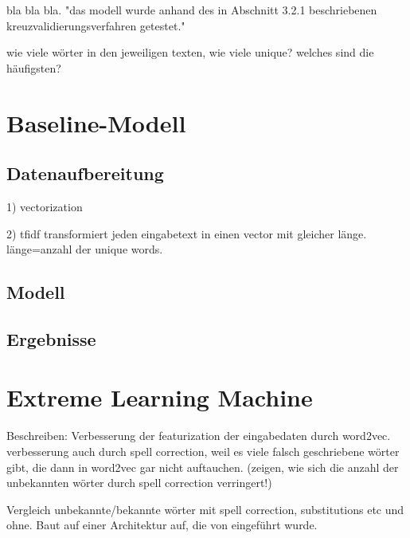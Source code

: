 bla bla bla. "das modell wurde anhand des in Abschnitt 3.2.1 beschriebenen kreuzvalidierungsverfahren getestet."

wie viele wörter in den jeweiligen texten, wie viele unique? welches sind die häufigsten?
\section{Baseline-Modell}
\subsection{Datenaufbereitung}
1) vectorization

2) tfidf transformiert jeden eingabetext in einen vector mit gleicher länge. länge=anzahl der unique words.
\subsection{Modell}
\subsection{Ergebnisse}
\section{Extreme Learning Machine}
Beschreiben: Verbesserung der featurization der eingabedaten durch word2vec. verbesserung auch durch spell correction, weil es viele falsch geschriebene wörter gibt, die dann in word2vec gar nicht auftauchen. (zeigen, wie sich die anzahl der unbekannten wörter durch spell correction verringert!)

Vergleich unbekannte/bekannte wörter mit spell correction, substitutions etc und ohne.
Baut auf einer Architektur auf, die von \cite{huangExtremeLearningMachine2006} eingeführt wurde.
